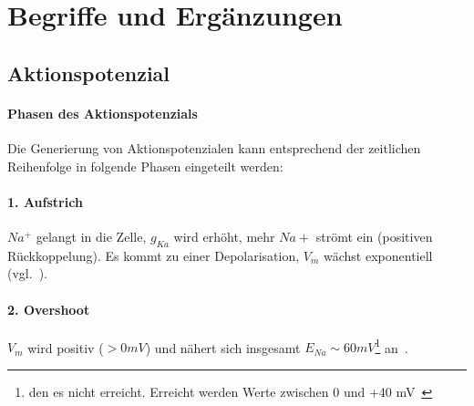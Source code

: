 \chapter{Begriffe und Ergänzungen}

\section{Aktionspotenzial}\label{appendix:aktionspotenzial}

\subsubsection{Phasen des Aktionspotenzials}
Die Generierung von Aktionspotenzialen kann entsprechend der zeitlichen Reihenfolge in folgende Phasen eingeteilt werden:

\subsubsection*{1. Aufstrich}
$Na^+$ gelangt in die Zelle,  $g_{Ka}$  wird erhöht, mehr $Na+$ strömt ein (positiven Rückkoppelung).
Es kommt zu einer Depolarisation, $V_m$ wächst exponentiell (vgl.~\cite[46]{SD07}).

\subsubsection*{2. Overshoot}
$V_m$ wird positiv ($> 0 mV$) und nähert sich insgesamt $E_{Na} \sim 60 mV$\footnote{
    den es nicht erreicht. Erreicht werden Werte zwischen 0 und +40 mV~\cite[69]{FE19}
} an~\cite[105]{BCP18}.

